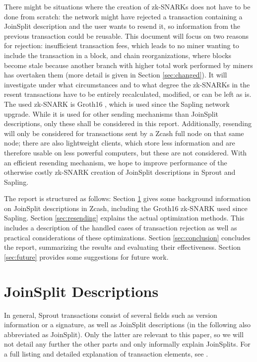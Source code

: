 \documentclass{article}
\begin{document}
There might be situations where the creation of zk-SNARKs does not have to be done from scratch: the network might have rejected a transaction containing a JoinSplit description and the user wants to resend it, so information from the previous transaction could be reusable.
This document will focus on two reasons for rejection: insufficient transaction fees, which leads to no miner wanting to include the transaction in a block, and chain reorganizations, where blocks become stale because another branch with higher total work performed by miners has overtaken them (more detail is given in Section \ref{sec:changed}).
It will investigate under what circumstances and to what degree the zk-SNARKs in the resent transactions have to be entirely recalculated, modified, or can be left as is.
The used zk-SNARK is Groth16 \cite{groth:zksnark}, which is used since the Sapling network upgrade.
While it is used for other sending mechanisms than JoinSplit descriptions, only these shall be considered in this report.
Additionally, resending will only be considered for transactions sent by a Zcash full node on that same node; there are also lightweight clients, which store less information and are therefore usable on less powerful computers, but these are not considered.
With an efficient resending mechanism, we hope to improve performance of the otherwise costly zk-SNARK creation of JoinSplit descriptions in Sprout and Sapling.

The report is structured as follows: Section \ref{sec:joinsplit} gives some background information on JoinSplit descriptions in Zcash, including the Groth16 zk-SNARK used since Sapling.
Section \ref{sec:resending} explains the actual optimization methods.
This includes a description of the handled cases of transaction rejection as well as practical considerations of these optimizations.
Section \ref{sec:conclusion} concludes the report, summarizing the results and evaluating their effectiveness.
Section \ref{sec:future} provides some suggestions for future work.

\section{JoinSplit Descriptions} \label{sec:joinsplit}

In general, Sprout transactions consist of several fields such as version information or a signature, as well as JoinSplit descriptions (in the following also abbreviated as JoinSplit).
Only the latter are relevant to this paper, so we will not detail any further the other parts and only informally explain JoinSplits.
For a full listing and detailed explanation of transaction elements, see \cite{hopwood:zcash}.
\end{document}
